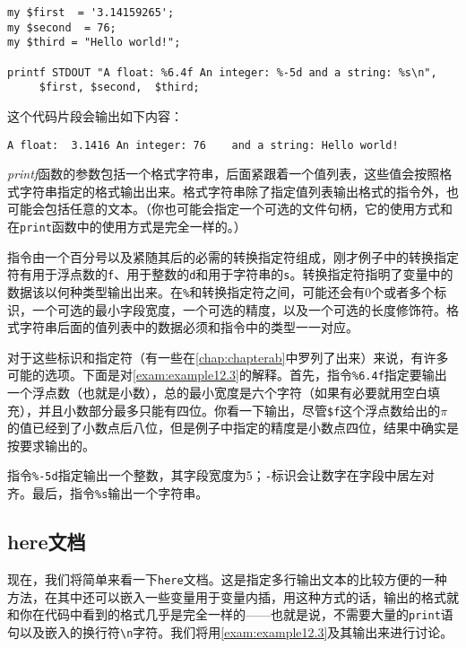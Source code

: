 \begin{lstlisting}
my $first  = '3.14159265';
my $second  = 76;
my $third = "Hello world!";

printf STDOUT "A float: %6.4f An integer: %-5d and a string: %s\n", 
     $first, $second,  $third;
\end{lstlisting}

这个代码片段会输出如下内容：

\begin{lstlisting}
A float:  3.1416 An integer: 76    and a string: Hello world!
\end{lstlisting}

\textit{printf}函数的参数包括一个格式字符串，后面紧跟着一个值列表，这些值会按照格式字符串指定的格式输出出来。格式字符串除了指定值列表输出格式的指令外，也可能会包括任意的文本。（你也可能会指定一个可选的文件句柄，它的使用方式和在\verb|print|函数中的使用方式是完全一样的。）

指令由一个百分号以及紧随其后的必需的转换指定符组成，刚才例子中的转换指定符有用于浮点数的\verb|f|、用于整数的\verb|d|和用于字符串的\verb|s|。转换指定符指明了变量中的数据该以何种类型输出出来。在\verb|%|和转换指定符之间，可能还会有0个或者多个标识，一个可选的最小字段宽度，一个可选的精度，以及一个可选的长度修饰符。格式字符串后面的值列表中的数据必须和指令中的类型一一对应。

对于这些标识和指定符（有一些在\autoref{chap:chapterab}中罗列了出来）来说，有许多可能的选项。下面是对\autoref{exam:example12.3}的解释。首先，指令\verb|%6.4f|指定要输出一个浮点数（也就是小数），总的最小宽度是六个字符（如果有必要就用空白填充），并且小数部分最多只能有四位。你看一下输出，尽管\verb|$f|这个浮点数给出的$\pi$的值已经到了小数点后八位，但是例子中指定的精度是小数点四位，结果中确实是按要求输出的。

指令\verb|%-5d|指定输出一个整数，其字段宽度为5；\verb|-|标识会让数字在字段中居左对齐。最后，指令\verb|%s|输出一个字符串。

\subsection{here文档}
现在，我们将简单来看一下\verb|here|文档。这是指定多行输出文本的比较方便的一种方法，在其中还可以嵌入一些变量用于变量内插，用这种方式的话，输出的格式就和你在代码中看到的格式几乎是完全一样的——也就是说，不需要大量的\verb|print|语句以及嵌入的换行符\verb|\n|字符。我们将用\autoref{exam:example12.3}及其输出来进行讨论。




